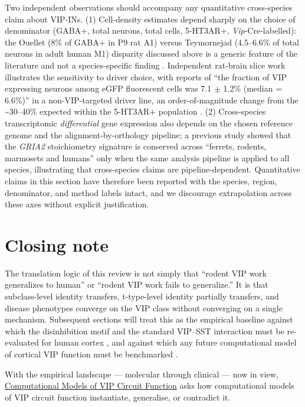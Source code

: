 \documentclass[11pt]{article}
\begin{document}
Two independent observations should accompany any quantitative
cross-species claim about VIP-INs. (1) Cell-density estimates depend
sharply on the choice of denominator (GABA+, total neurons, total cells,
5-HT3AR+, \textit{Vip}-Cre-labelled): the Ouellet (8\% of GABA+ in P9 rat A1)
versus Teymornejad (4.5--6.6\% of total neurons in adult human M1)
disparity discussed above is a generic feature of the literature and
not a species-specific finding \citep{Ouellet2014}.
Independent rat-brain slice work illustrates the sensitivity to driver
choice, with reports of ``the fraction of VIP expressing neurons among
eGFP fluorescent cells was 7.1 $\pm$ 1.2\% (median = 6.6\%)'' in
a non-VIP-targeted driver line, an order-of-magnitude change from the
{\textasciitilde}30--40\% expected within the 5-HT3AR+ population
\citep{Rudy2011}. (2) Cross-species transcriptomic
\textit{differential} gene expression also depends on the chosen reference
genome and the alignment-by-orthology pipeline; a previous study
showed that the \textit{GRIA2} stoichiometry signature is conserved across
``ferrets, rodents, marmosets and humans'' only when the same
analysis pipeline is applied to all species, illustrating that
cross-species claims are pipeline-dependent. Quantitative claims in
this section have therefore been reported with the species, region,
denominator, and method labels intact, and we discourage extrapolation
across these axes without explicit justification.

\section{Closing note}

The translation logic of this review is not simply that ``rodent VIP
work generalizes to human'' or ``rodent VIP work fails to generalize.''
It is that subclass-level identity transfers, t-type-level identity
partially transfers, and disease phenotypes converge on the VIP class
without converging on a single mechanism. Subsequent sections will treat
this as the empirical baseline against which the disinhibition motif and
the standard VIP--SST interaction must be re-evaluated for human cortex
\citep{Hodge2019, Bakken2021a, Lee2023a, Goff2023, Bhandari2024, Mossner2020, Chen2023b, Hanno2026},
and against which any future computational model of cortical VIP
function must be benchmarked
\citep{Yao2023, Hodge2019, Lee2023a, Chartrand2023, Boldog2018}.

With the empirical landscape --- molecular through clinical --- now in view, \href{/computational-models}{Computational Models of VIP Circuit Function} asks how computational models of VIP circuit function instantiate, generalise, or contradict it.
\end{document}
